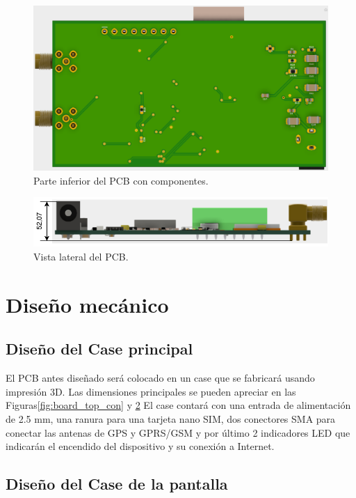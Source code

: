 \begin{figure}[hbtp!]
\centering
\includegraphics[width=\textwidth]{board_com_bottom.png}
\caption{Parte inferior del PCB con componentes.}
\label{fig:board_bottom_con}
\end{figure}

\begin{figure}[hbtp!]
\centering
\includegraphics[width=\textwidth]{board_side_dim.pdf}
\caption{Vista lateral del PCB.}
\label{fig:board_side_con}
\end{figure}


\section{Diseño mecánico}

\subsection{Diseño del Case principal}

El PCB antes diseñado será colocado en un case que se fabricará usando impresión 3D. Las dimensiones principales se pueden apreciar en las Figuras\ref{fig:board_top_con} y \ref{fig:board_side_con} El case contará con una entrada de alimentación de 2.5 mm, una ranura para una tarjeta nano SIM, dos conectores SMA para conectar las antenas de GPS y GPRS/GSM y por último 2 indicadores LED que indicarán el encendido del dispositivo y su conexión a Internet.
\subsection{Diseño del Case de la pantalla}

